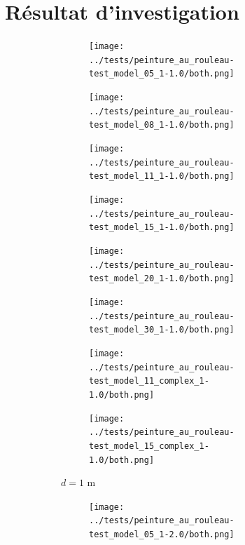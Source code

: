 \documentclass[english,RandD]{rapportPFE}  %
\begin{document}
	\section{Résultat d'investigation}
		\label{annexe:resultat}
		\begin{figure}[H]
			\centering
			\begin{subfigure}[t]{\linewidth}
				\centering
				\begin{subfigure}[t]{0.12\linewidth}
					\texttt{[image: ../tests/peinture\_au\_rouleau-test\_model\_05\_1-1.0/both.png]}
				\end{subfigure}
				\hfill
				\begin{subfigure}[t]{0.11\linewidth}
					\texttt{[image: ../tests/peinture\_au\_rouleau-test\_model\_08\_1-1.0/both.png]}
				\end{subfigure}
				\hfill
				\begin{subfigure}[t]{0.11\linewidth}
					\texttt{[image: ../tests/peinture\_au\_rouleau-test\_model\_11\_1-1.0/both.png]}
				\end{subfigure}
				\hfill
				\begin{subfigure}[t]{0.11\linewidth}
					\texttt{[image: ../tests/peinture\_au\_rouleau-test\_model\_15\_1-1.0/both.png]}
				\end{subfigure}
				\hfill
				\begin{subfigure}[t]{0.11\linewidth}
					\texttt{[image: ../tests/peinture\_au\_rouleau-test\_model\_20\_1-1.0/both.png]}
				\end{subfigure}
				\hfill
				\begin{subfigure}[t]{0.11\linewidth}
					\texttt{[image: ../tests/peinture\_au\_rouleau-test\_model\_30\_1-1.0/both.png]}
				\end{subfigure}
				\hfill
				\begin{subfigure}[t]{0.11\linewidth}
					\texttt{[image: ../tests/peinture\_au\_rouleau-test\_model\_11\_complex\_1-1.0/both.png]}
				\end{subfigure}
				\hfill
				\begin{subfigure}[t]{0.11\linewidth}
					\texttt{[image: ../tests/peinture\_au\_rouleau-test\_model\_15\_complex\_1-1.0/both.png]}
				\end{subfigure}
				\caption{$d = 1$ m}
			\end{subfigure}
			\hfill
			\begin{subfigure}[t]{\linewidth}
				\centering
				\begin{subfigure}[t]{0.11\linewidth}
					\texttt{[image: ../tests/peinture\_au\_rouleau-test\_model\_05\_1-2.0/both.png]}

\end{subfigure}
\end{subfigure}
\end{figure}
\end{document}
